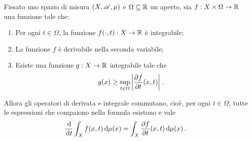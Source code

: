 \begin{theorem} \label{th:CommutazioneDerivataIntegrale}
	Fissato uno spazio di misura $(X,\mathscr A,\mu)$ e $\Omega\subseteq\mathbb R$ un aperto, sia $f:X\times\Omega\to\mathbb R$ una funzione tale che:
	\begin{enumerate}
		\item Per ogni $t\in\Omega$, la funzione $f({}\cdot,t):X\to\mathbb R$ è integrabile; \label{it:CommutazioneIntegrabile}
		\item La funzione $f$ è derivabile nella seconda variabile; \label{it:CommutazioneDerivabile}
		\item Esiste una funzione $g:X\to\mathbb R$ integrabile tale che \label{it:CommutazioneDominazione}
		\begin{equation*}
			g(x)\ge \sup_{t\in\Omega}\left\lvert \frac{\partial f}{\partial t}(x,t)\right\rvert \, \text{. }
		\end{equation*}
	\end{enumerate}
	Allora gli operatori di derivata e integrale commutano, cioè, per ogni $t\in\Omega$, tutte le espressioni che compaiono nella formula esistono e vale
	\begin{equation*}
		\frac{\,\mathrm d}{\,\mathrm d t}\int_X f(x,t)\,\mathrm d \mu(x)=\int_X\frac{\partial f}{\partial t}(x,t)\,\mathrm d\mu(x) \, \text{. }
	\end{equation*}
\end{theorem}
